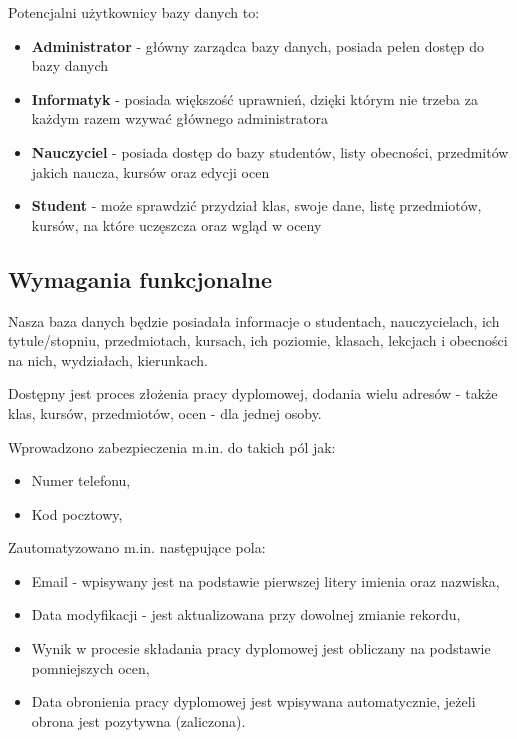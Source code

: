 \documentclass[12pt,a4paper]{article}
\begin{document}
Potencjalni użytkownicy bazy danych to: 

\begin{itemize}
	\item \textbf{Administrator} - główny zarządca bazy danych, posiada pełen dostęp do bazy danych 
	\item \textbf{Informatyk} - posiada większość uprawnień, dzięki którym nie trzeba za każdym razem wzywać głównego administratora
	\item \textbf{Nauczyciel} - posiada dostęp do bazy studentów, listy obecności, przedmitów jakich naucza, kursów oraz edycji ocen
	\item \textbf{Student} - może sprawdzić przydział klas, swoje dane, listę przedmiotów, kursów, na które uczęszcza oraz wgląd w oceny
\end{itemize}

\subsection{Wymagania funkcjonalne}
\label{sec:FunctionalConditions}

Nasza baza danych będzie posiadała informacje o studentach, nauczycielach, ich tytule/stopniu, przedmiotach, kursach, ich poziomie, klasach, lekcjach i obecności na nich, wydziałach, kierunkach.

Dostępny jest proces złożenia pracy dyplomowej, dodania wielu adresów - także klas, kursów, przedmiotów, ocen - dla jednej osoby.

Wprowadzono zabezpieczenia m.in. do takich pól jak:
\begin{itemize}
	\item Numer telefonu,
	\item Kod pocztowy,
\end{itemize}

Zautomatyzowano m.in. następujące pola:
\begin{itemize}
	\item Email - wpisywany jest na podstawie pierwszej litery imienia oraz nazwiska,
	\item Data modyfikacji - jest aktualizowana przy dowolnej zmianie rekordu,
	\item Wynik w procesie składania pracy dyplomowej jest obliczany na podstawie pomniejszych ocen,
	\item Data obronienia pracy dyplomowej jest wpisywana automatycznie, jeżeli obrona jest pozytywna (zaliczona).
\end{itemize}
\end{document}
